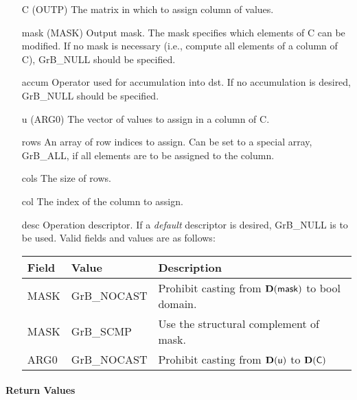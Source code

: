 \begin{itemize}[leftmargin=1.1in]
    \item[{\sf C}]   ({\sf OUTP}) The matrix in which to assign column of values.

    \item[{\sf mask}] ({\sf MASK}) Output mask. The mask specifies which elements
    of {\sf C} can be modified. If no mask is necessary (i.e., compute all
    elements of a column of {\sf C}), {\sf GrB\_NULL} should be specified.

    \item[{\sf accum}] Operator used for accumulation into {\sf dst}.  If no accumulation
                        is desired, {\sf GrB\_NULL} should be specified.

    \item[{\sf u}]   ({\sf ARG0}) The vector of values to assign in a column of {\sf C}.

    \item[{\sf rows}]     An array of row indices to assign. Can
                              be set to a special array, {\sf GrB\_ALL}, if all elements
                              are to be assigned to the column.
    \item[{\sf cols}]    The size of {\sf rows}.
    \item[{\sf col}]     The index of the column to assign.

    \item[{\sf desc}]   Operation descriptor. If a
    \emph{default} descriptor is desired, {\sf GrB\_NULL} is to be
    used. Valid fields and values are as follows: \\
    \begin{tabular}{lll}
    Field  & Value & Description \\
    \hline
    {\sf MASK} & {\sf GrB\_NOCAST} & Prohibit casting from $\bold{D}({\sf mask})$ to {\sf bool} domain. \\
    {\sf MASK} & {\sf GrB\_SCMP} & Use the structural complement of {\sf mask}. \\
    {\sf ARG0} & {\sf GrB\_NOCAST} & Prohibit casting from $\bold{D}({\sf u})$ to $\bold{D}({\sf C})$ \\
    \end{tabular}

\end{itemize}

\paragraph{Return Values}

